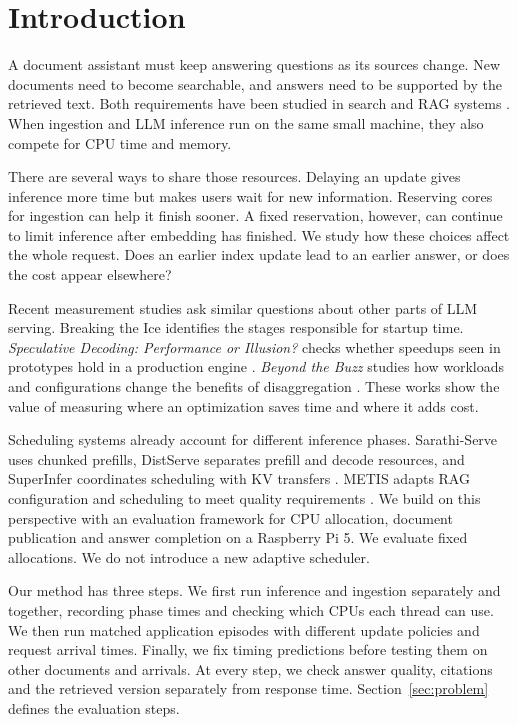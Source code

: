 \section{Introduction}
A document assistant must keep answering questions as its sources change.
New documents need to become searchable, and answers need to be supported by
the retrieved text. Both requirements have been studied in search and RAG
systems \citep{freshdiskann,metis,alce}. When ingestion and LLM inference run
on the same small machine, they also compete for CPU time and memory.

There are several ways to share those resources. Delaying an update gives
inference more time but makes users wait for new information. Reserving cores
for ingestion can help it finish sooner. A fixed reservation, however, can
continue to limit inference after embedding has finished. We study how these
choices affect the whole request. Does an earlier index update lead to an
earlier answer, or does the cost appear elsewhere?

Recent measurement studies ask similar questions about other parts of LLM
serving. Breaking the Ice identifies the stages responsible for startup time.
\emph{Speculative Decoding: Performance or Illusion?} checks whether speedups
seen in prototypes hold in a production engine \citep{breakingice,specillusion}.
\emph{Beyond the Buzz} studies how workloads and configurations change the
benefits of disaggregation \citep{beyondbuzz}. These works show the value of
measuring where an optimization saves time and where it adds cost.

Scheduling systems already account for different inference phases.
Sarathi-Serve uses chunked prefills, DistServe separates prefill and decode
resources, and SuperInfer coordinates scheduling with KV transfers
\citep{sarathi,distserve,superinfer}. METIS adapts RAG configuration and
scheduling to meet quality requirements \citep{metis}. We build on this
perspective with an evaluation framework for CPU allocation, document publication and
answer completion on a Raspberry Pi 5. We evaluate fixed allocations.
We do not introduce a new adaptive scheduler.

Our method has three steps. We first run inference and ingestion separately
and together, recording phase times and checking which CPUs each thread can
use. We then run matched application episodes with different update policies
and request arrival times. Finally, we fix timing predictions before testing
them on other documents and arrivals. At every step, we check answer quality,
citations and the retrieved version separately from response time.
Section~\ref{sec:problem} defines the evaluation steps.

